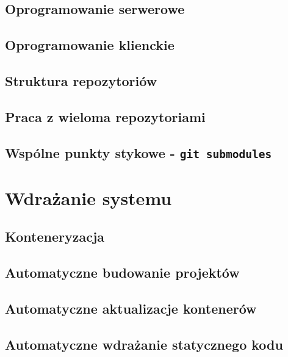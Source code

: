 \section{Oprogramowanie serwerowe}
\section{Oprogramowanie klienckie}

\section{Struktura repozytoriów}
\section{Praca z wieloma repozytoriami}
\section{Wspólne punkty stykowe - \texttt{git submodules}}


\chapter{Wdrażanie systemu}

\section{Konteneryzacja}
\section{Automatyczne budowanie projektów}
\section{Automatyczne aktualizacje kontenerów}
\section{Automatyczne wdrażanie statycznego kodu}


